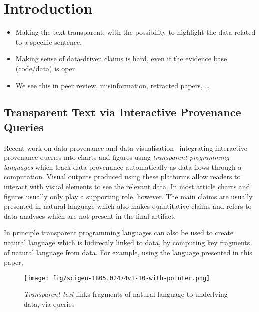 \section{Introduction}

\lstset{
    aboveskip=-7pt,
    belowskip=-8.5pt,
    xleftmargin=0pt,
    xrightmargin=0pt
}

\begin{itemize}
    \item Making the text transparent, with the possibility to highlight the data related to a specific sentence.
    \item Making sense of data-driven claims is hard, even if the evidence base (code/data) is open
    \item We see this in peer review, misinformation, retracted papers, …
\end{itemize}

\subsection{Transparent Text via Interactive Provenance Queries}

Recent work on data provenance and data visualisation~\citep{psallidas18smoke,perera22,bond25} integrating
interactive provenance queries into charts and figures using \emph{transparent programming languages} which
track data provenance automatically as data flows through a computation. Visual outputs produced using these
platforms allow readers to interact with visual elements to see the relevant data. In most article charts and
figures usually only play a supporting role, however. The main claims are usually presented in natural
language which also makes quantitative claims and refers to data analyses which are not present in the final
artifact.

In principle transparent programming languages can also be used to create natural language which is bidirectly
linked to data, by computing key fragments of natural language from data. For example, using the language
presented in this paper,

\begin{figure}[h]
    \centering
    \texttt{[image: fig/scigen-1805.02474v1-10-with-pointer.png]}
    \caption{\emph{Transparent text} links fragments of natural language to underlying data, via queries}\label{fig:scigen-example-website}
\end{figure}


